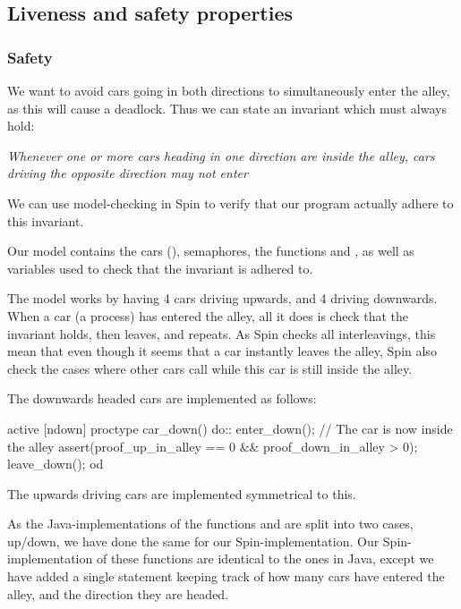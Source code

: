 
\subsection{Liveness and safety properties}
\label{sub:all-proof}
\subsubsection{Safety}
We want to avoid cars going in both directions to simultaneously enter the alley, as this will cause a deadlock. Thus we can state an invariant which must always hold:


\emph{Whenever one or more cars heading in one direction are inside the alley, cars driving the opposite direction may not enter}


We can use model-checking in Spin to verify that our program actually adhere to this invariant.

Our model contains the cars (), semaphores, the functions  and , as well as variables used to check that the invariant is adhered to.

The model works by having 4 cars driving upwards, and 4 driving downwards. When a car (a process) has entered the alley, all it does is check that the invariant holds, then leaves, and repeats. As Spin checks all interleavings, this mean that even though it seems that a car instantly leaves the alley, Spin also check the cases where other cars call  while this car is still inside the alley.

The downwards headed cars are implemented as follows:
\begin{promela}
active [ndown] proctype car_down(){
	do::
		enter_down();
		// The car is now inside the alley
		assert(proof_up_in_alley == 0 && proof_down_in_alley > 0);
		leave_down();
	od
}
\end{promela}

The upwards driving cars are implemented symmetrical to this.

As the Java-implementations of the functions  and  are split into two cases, up/down, we have done the same for our Spin-implementation. Our Spin-implementation of these functions are identical to the ones in Java, except we have added a single statement keeping track of how many cars have entered the alley, and the direction they are headed.

